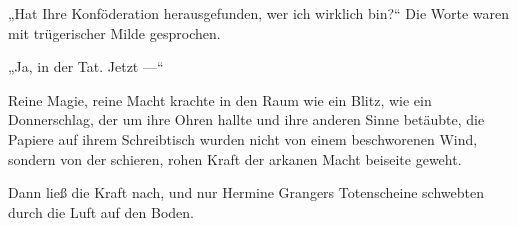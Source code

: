 „Hat Ihre Konföderation herausgefunden, wer ich wirklich bin?“ Die Worte waren mit trügerischer Milde gesprochen.

„Ja, in der Tat. Jetzt —“

Reine Magie, reine Macht krachte in den Raum wie ein Blitz, wie ein Donnerschlag, der um ihre Ohren hallte und ihre anderen Sinne betäubte, die Papiere auf ihrem Schreibtisch wurden nicht von einem beschworenen Wind, sondern von der schieren, rohen Kraft der arkanen Macht beiseite geweht.

Dann ließ die Kraft nach, und nur Hermine Grangers Totenscheine schwebten durch die Luft auf den Boden.

